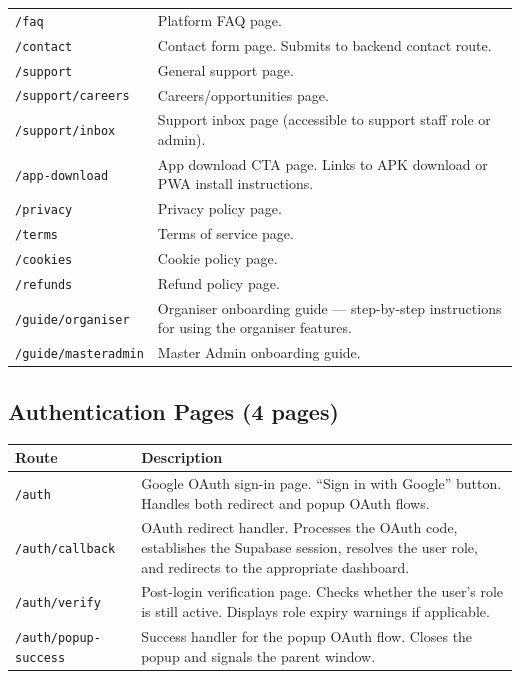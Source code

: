\documentclass[12pt,a4paper]{article}
\begin{document}
\begin{longtable}{L{5cm} X}
\addlinespace
\texttt{/faq} & Platform FAQ page. \\
\addlinespace
\texttt{/contact} & Contact form page. Submits to backend contact route. \\
\addlinespace
\texttt{/support} & General support page. \\
\addlinespace
\texttt{/support/careers} & Careers/opportunities page. \\
\addlinespace
\texttt{/support/inbox} & Support inbox page (accessible to support staff role or admin). \\
\addlinespace
\texttt{/app-download} & App download CTA page. Links to APK download or PWA install instructions. \\
\addlinespace
\texttt{/privacy} & Privacy policy page. \\
\addlinespace
\texttt{/terms} & Terms of service page. \\
\addlinespace
\texttt{/cookies} & Cookie policy page. \\
\addlinespace
\texttt{/refunds} & Refund policy page. \\
\addlinespace
\texttt{/guide/organiser} & Organiser onboarding guide — step-by-step instructions for using the organiser features. \\
\addlinespace
\texttt{/guide/masteradmin} & Master Admin onboarding guide. \\
\bottomrule
\end{longtable}

\subsection{Authentication Pages (4 pages)}

\begin{tabularx}{\textwidth}{L{5cm} X}
\toprule
{}
\textbf{Route} & \textbf{Description} \\
\midrule
\texttt{/auth} & Google OAuth sign-in page. ``Sign in with Google'' button. Handles both redirect and popup OAuth flows. \\
\texttt{/auth/callback} & OAuth redirect handler. Processes the OAuth code, establishes the Supabase session, resolves the user role, and redirects to the appropriate dashboard. \\
\texttt{/auth/verify} & Post-login verification page. Checks whether the user's role is still active. Displays role expiry warnings if applicable. \\
\texttt{/auth/popup-success} & Success handler for the popup OAuth flow. Closes the popup and signals the parent window. \\
\bottomrule
\end{tabularx}
\end{document}
